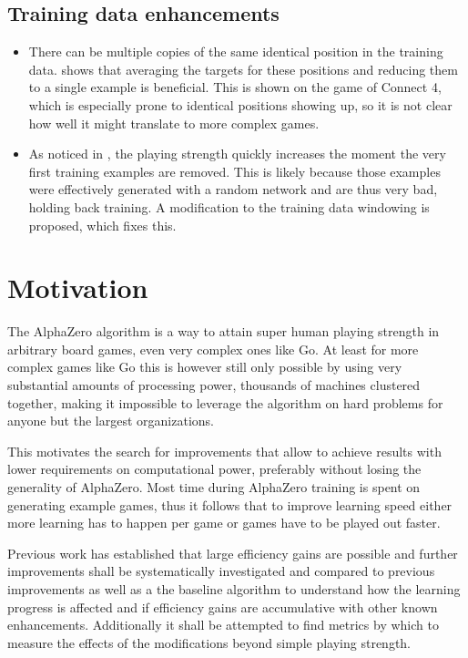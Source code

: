 \documentclass[12pt,onecolumn,oneside,titlepage]{article}
\begin{document}
\subsection{Training data enhancements}
\begin{itemize}
 \item There can be multiple copies of the same identical position in the training data. \cite{oracledevs6} shows that averaging the targets for these positions and reducing them to a single example is beneficial. This is shown on the game of Connect 4,
 which is especially prone to identical positions showing up, so it is not clear how well it might translate to more complex games.
 \item As noticed in \cite{oracledevs6}, the playing strength quickly increases the moment the very first training examples are removed. This is likely because those examples were effectively generated with a random network and are thus very bad, holding back training.
 A modification to the training data windowing is proposed, which fixes this.
\end{itemize}

\section{Motivation}

The AlphaZero algorithm is a way to attain super human playing strength in arbitrary board games, even very complex ones like Go.
At least for more complex games like Go this is however still only possible by using very substantial amounts of processing power, thousands of machines clustered together,
making it impossible to leverage the algorithm on hard problems for anyone but the largest organizations.

This motivates the search for improvements that allow to achieve results with lower requirements on computational power, preferably without losing the generality of AlphaZero.
Most time during AlphaZero training is spent on generating example games,
thus it follows that to improve learning speed either more learning has to happen per game or games have to be played out faster.

Previous work has established that large efficiency gains are possible and further improvements shall be systematically investigated and compared to previous improvements as well as a the baseline algorithm to understand how the learning progress is affected and if efficiency gains
are accumulative with other known enhancements.
Additionally it shall be attempted to find metrics by which to measure the effects of the modifications beyond simple playing strength.
\end{document}
